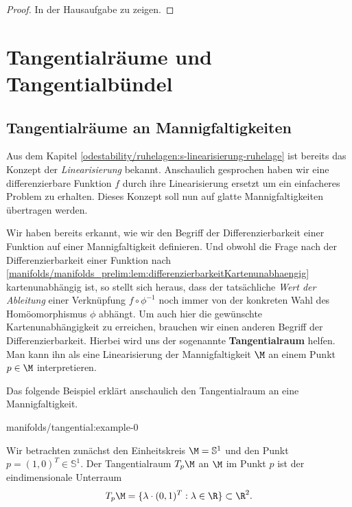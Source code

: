 \documentclass[letterpaper,10pt,german]{jupyterBook}
\begin{document}
\begin{proof}
 In der Hausaufgabe zu zeigen.
\end{proof}


\section{Tangentialräume und Tangentialbündel}
\label{\detokenize{manifolds/tangential:tangentialraume-und-tangentialbundel}}\label{\detokenize{manifolds/tangential::doc}}

\subsection{Tangentialräume an Mannigfaltigkeiten}
\label{\detokenize{manifolds/tangential:tangentialraume-an-mannigfaltigkeiten}}
\par
Aus dem Kapitel \cref{odestability/ruhelagen:s-linearisierung-ruhelage}  ist bereits das Konzept der \emph{Linearisierung} bekannt.
Anschaulich gesprochen haben wir eine differenzierbare Funktion \(f\) durch ihre Linearisierung ersetzt um ein einfacheres Problem zu erhalten.
Dieses Konzept soll nun auf glatte Mannigfaltigkeiten übertragen werden.

\par
Wir haben bereits erkannt, wie wir den Begriff der Differenzierbarkeit einer Funktion auf einer Mannigfaltigkeit definieren.
Und obwohl die Frage nach der Differenzierbarkeit einer Funktion nach \cref{manifolds/manifolds_prelim:lem:differenzierbarkeitKartenunabhaengig} kartenunabhängig ist, so stellt sich heraus, dass der tatsächliche \emph{Wert der Ableitung} einer Verknüpfung \(f \circ\phi^{-1}\) noch immer von der konkreten Wahl des Homöomorphismus \(\phi\) abhängt.
Um auch hier die gewünschte Kartenunabhängigkeit zu erreichen, brauchen wir einen anderen Begriff der Differenzierbarkeit.
Hierbei wird uns der sogenannte \textbf{Tangentialraum} helfen.
Man kann ihn als eine Linearisierung der Mannigfaltigkeit \(\M\) an einem Punkt \(p\in\M\) interpretieren.

\par
Das folgende Beispiel erklärt anschaulich den Tangentialraum an eine Mannigfaltigkeit.
\begin{example}{}{manifolds/tangential:example-0}



\par
Wir betrachten zunächst den Einheitskreis \(\M = \mathbb{S}^1\) und den Punkt \(p = (1, 0)^T \in \mathbb{S}^1\).
Der Tangentialraum \(T_p\M\) an \(\M\) im Punkt \(p\) ist der eindimensionale Unterraum
\begin{align*}
T_p\M = \lbrace \lambda \cdot (0, 1)^T : \lambda \in \R \rbrace \subset \R^2.
\end{align*}\end{example}
\end{document}
